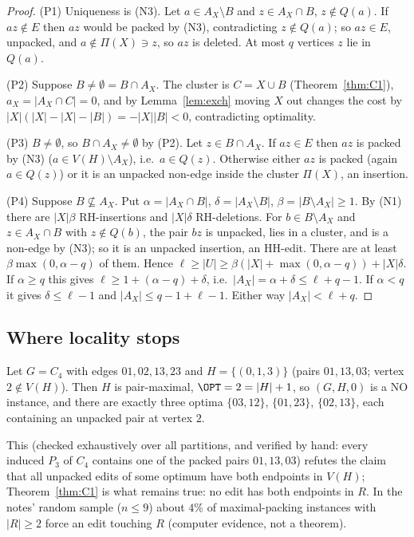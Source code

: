 \begin{proof}
(P1) Uniqueness is (N3). Let $a\in A_X\setminus B$ and $z\in A_X\cap B$, $z\notin Q(a)$. If $az\notin E$ then $az$ would be packed by (N3), contradicting $z\notin Q(a)$; so $az\in E$, unpacked, and $a\notin\Pi(X)\ni z$, so $az$ is deleted. At most $q$ vertices $z$ lie in $Q(a)$.

(P2) Suppose $B\ne\emptyset=B\cap A_X$. The cluster is $C=X\cup B$ (Theorem~\ref{thm:C1}), $a_X=|A_X\cap C|=0$, and by Lemma~\ref{lem:exch} moving $X$ out changes the cost by $|X|(|X|-|X|-|B|)=-|X||B|<0$, contradicting optimality.

(P3) $B\neq\emptyset$, so $B\cap A_X\ne\emptyset$ by (P2). Let $z\in B\cap A_X$. If $az\in E$ then $az$ is packed by (N3) ($a\in V(H)\setminus A_X$), i.e.\ $a\in Q(z)$. Otherwise either $az$ is packed (again $a\in Q(z)$) or it is an unpacked non-edge inside the cluster $\Pi(X)$, an insertion.

(P4) Suppose $B\not\subseteq A_X$. Put $\alpha=|A_X\cap B|$, $\delta=|A_X\setminus B|$, $\beta=|B\setminus A_X|\ge1$. By (N1) there are $|X|\beta$ RH-insertions and $|X|\delta$ RH-deletions. For $b\in B\setminus A_X$ and $z\in A_X\cap B$ with $z\notin Q(b)$, the pair $bz$ is unpacked, lies in a cluster, and is a non-edge by (N3); so it is an unpacked insertion, an HH-edit. There are at least $\beta\max(0,\alpha-q)$ of them. Hence $\ell\ge|U|\ge\beta(|X|+\max(0,\alpha-q))+|X|\delta$. If $\alpha\ge q$ this gives $\ell\ge1+(\alpha-q)+\delta$, i.e.\ $|A_X|=\alpha+\delta\le\ell+q-1$. If $\alpha<q$ it gives $\delta\le\ell-1$ and $|A_X|\le q-1+\ell-1$. Either way $|A_X|<\ell+q$.
\end{proof}

\subsection{Where locality stops}
\begin{proposition}\label{prop:c4}
Let $G=C_4$ with edges $01,02,13,23$ and $H=\{(0,1,3)\}$ (pairs $01,13,03$; vertex $2\notin V(H)$). Then $H$ is pair-maximal, $\OPT=2=|H|+1$, so $(G,H,0)$ is a NO instance, and there are exactly three optima $\{03,12\}$, $\{01,23\}$, $\{02,13\}$, each containing an unpacked pair at vertex $2$.
\end{proposition}
This (checked exhaustively over all partitions, and verified by hand: every induced $P_3$ of $C_4$ contains one of the packed pairs $01,13,03$) refutes the claim that all unpacked edits of some optimum have both endpoints in $V(H)$; Theorem~\ref{thm:C1} is what remains true: no edit has both endpoints in $R$. In the notes' random sample ($n\le9$) about $4\%$ of maximal-packing instances with $|R|\ge2$ force an edit touching $R$ (computer evidence, not a theorem).

